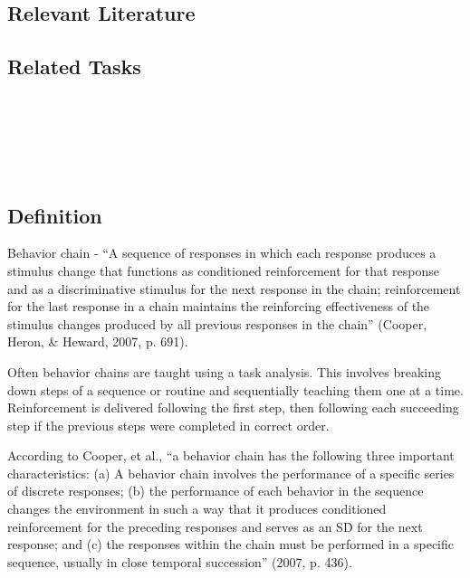 \subsection{Relevant Literature}
\begin{refsection}
\nocite{cooper2007applied,
    lovaas1977autistic,
    newman2009reasonable,
    pryor1999don,
    ricciardi2006shaping,
    skinner1979shaping}
\printbibliography[heading=none]
\end{refsection}
%
\subsection{Related Tasks}
\fourdOne{}\\
\fourdFive{}\\
\fourdTwentyOne{}\\
\fourFKFourtyOne{}\\
%
%
%
%
%
%
%
%
%
\section{\fourdSix{}}
\subsection{Definition}  
Behavior chain - ``A sequence of responses in which each response produces a stimulus change that functions as conditioned reinforcement for that response and as a discriminative stimulus for the next response in the chain; reinforcement for the last response in a chain maintains the reinforcing effectiveness of the stimulus changes produced by all previous responses in the chain'' (Cooper, Heron, \& Heward, 2007, p. 691).

Often behavior chains are taught using a task analysis. This involves breaking down steps of a sequence or routine and sequentially teaching them one at a time. Reinforcement is delivered following the first step, then following each succeeding step if the previous steps were completed in correct order.

According to Cooper, et al., ``a behavior chain has the following three important characteristics: (a) A behavior chain involves the performance of a specific series of discrete responses; (b) the performance of each behavior in the sequence changes the environment in such a way that it produces conditioned reinforcement for the preceding responses and serves as an SD  for the next response; and (c) the responses within the chain must be performed in a specific sequence, usually in close temporal succession'' (2007, p. 436).

